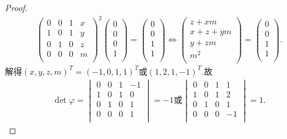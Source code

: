 \documentclass[../../main.tex]{subfiles}
\begin{document}
\begin{proof}
\begin{align*}
\begin{pmatrix}
0&		0&		1&		x\\
1&		0&		1&		y\\
0&		1&		0&		z\\
0&		0&		0&		m\\
\end{pmatrix}^2 \left( \begin{array}{c}
0\\
0\\
0\\
1\\
\end{array} \right) =\left( \begin{array}{c}
0\\
0\\
1\\
1\\
\end{array} \right) \Longleftrightarrow \left( \begin{array}{c}
z+xm\\
x+z+ym\\
y+zm\\
m^2\\
\end{array} \right) =\left( \begin{array}{c}
0\\
0\\
1\\
1\\
\end{array} \right) .
\end{align*}
解得$(x,y,z,m)^T=(-1,0,1,1)^T$或$(1,2,1,-1)^T$.故
\begin{align*}
\det \varphi=\begin{vmatrix}
0&		0&		1&		-1\\
1&		0&		1&		0\\
0&		1&		0&		1\\
0&		0&		0&		1\\
\end{vmatrix}=-1\text{或}\begin{vmatrix}
0&		0&		1&		1\\
1&		0&		1&		2\\
0&		1&		0&		1\\
0&		0&		0&		-1\\
\end{vmatrix}=1.
\end{align*}
\end{proof}
\end{document}
